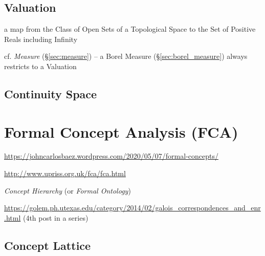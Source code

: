 \subsection{Valuation}\label{sec:domain_valuation}

a map from the Class of Open Sets of a Topological Space to the Set of Positive
Reals including Infinity

\fist cf. \emph{Measure} (\S\ref{sec:measure}) -- a Borel Measure
(\S\ref{sec:borel_measure}) always restricts to a Valuation



\subsection{Continuity Space}\label{sec:continuity_space}



\section{Formal Concept Analysis (FCA)}\label{sec:fca}


\url{https://johncarlosbaez.wordpress.com/2020/05/07/formal-concepts/}

\url{http://www.upriss.org.uk/fca/fca.html}

\emph{Concept Hierarchy} (or \emph{Formal Ontology})

\url{https://golem.ph.utexas.edu/category/2014/02/galois_correspondences_and_enr.html}
(4th post in a series)



\subsection{Concept Lattice}\label{sec:concept_lattice}

